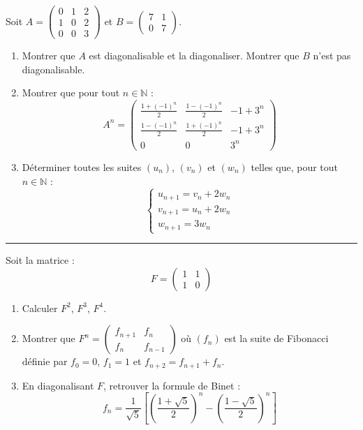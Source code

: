 \documentclass[../PolyS4.tex]{subfiles}
\begin{document}

Soit $A = \begin{pmatrix}
0 & 1 & 2 \\
1 & 0 & 2 \\
0 & 0 & 3
\end{pmatrix}$ et $B = \begin{pmatrix}
7 & 1 \\
0 & 7
\end{pmatrix}$.

\begin{enumerate}
    \item Montrer que $A$ est diagonalisable et la diagonaliser. Montrer que $B$ n'est pas diagonalisable.
    \item Montrer que pour tout $n \in \mathbb{N}$ :
    $$A^n = \begin{pmatrix}
    \frac{1+(-1)^n}{2} & \frac{1-(-1)^n}{2} & -1+3^n \\
    \frac{1-(-1)^n}{2} & \frac{1+(-1)^n}{2} & -1+3^n \\
    0 & 0 & 3^n
    \end{pmatrix}$$
    \item Déterminer toutes les suites $(u_n)$, $(v_n)$ et $(w_n)$ telles que, pour tout $n \in \mathbb{N}$ :
    $$\begin{cases}
    u_{n+1} = v_n + 2w_n \\
    v_{n+1} = u_n + 2w_n \\
    w_{n+1} = 3w_n
    \end{cases}$$
\end{enumerate}

\vspace{1em}
\hrule
\vspace{1em}


Soit la matrice :
$$F = \begin{pmatrix}
1 & 1 \\
1 & 0
\end{pmatrix}$$
\begin{enumerate}
    \item Calculer $F^2$, $F^3$, $F^4$.
    \item Montrer que $F^n = \begin{pmatrix}
    f_{n+1} & f_n \\
    f_n & f_{n-1}
    \end{pmatrix}$ où $(f_n)$ est la suite de Fibonacci définie par $f_0 = 0$, $f_1 = 1$ et $f_{n+2} = f_{n+1} + f_n$.
    \item En diagonalisant $F$, retrouver la formule de Binet :
    $$f_n = \frac{1}{\sqrt{5}}\left[\left(\frac{1+\sqrt{5}}{2}\right)^n - \left(\frac{1-\sqrt{5}}{2}\right)^n\right]$$
\end{enumerate}
\end{document}
